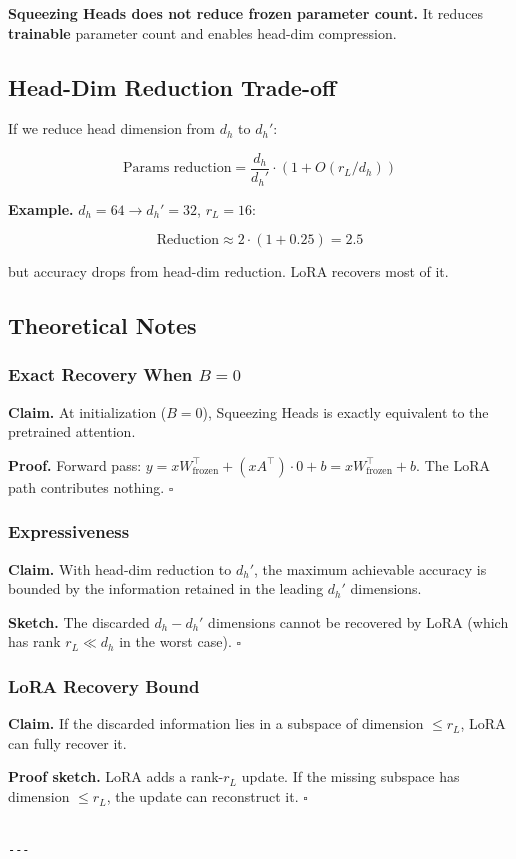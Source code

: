 \textbf{Squeezing Heads does not reduce frozen parameter count.} It reduces 
\textbf{trainable} parameter count and enables head-dim compression.

\subsection{Head-Dim Reduction Trade-off}

If we reduce head dimension from $d_h$ to $d_h'$:

\[
\text{Params reduction} = \frac{d_h}{d_h'} \cdot \left(1 + O(r_L / d_h)\right)
\]

\textbf{Example.} $d_h = 64 \to d_h' = 32$, $r_L = 16$:

\[
\text{Reduction} \approx 2 \cdot (1 + 0.25) = 2.5
\]

but accuracy drops from head-dim reduction. LoRA recovers most of it.

\subsection{Theoretical Notes}

\subsubsection{Exact Recovery When $B = 0$}

\textbf{Claim.} At initialization ($B = 0$), Squeezing Heads is exactly 
equivalent to the pretrained attention.

\textbf{Proof.} Forward pass: $y = x W_\text{frozen}^\top + (x A^\top) \cdot 0 + b = x W_\text{frozen}^\top + b$. The LoRA path contributes nothing. $\square$

\subsubsection{Expressiveness}

\textbf{Claim.} With head-dim reduction to $d_h'$, the maximum achievable 
accuracy is bounded by the information retained in the leading $d_h'$ 
dimensions.

\textbf{Sketch.} The discarded $d_h - d_h'$ dimensions cannot be recovered by 
LoRA (which has rank $r_L \ll d_h$ in the worst case). $\square$

\subsubsection{LoRA Recovery Bound}

\textbf{Claim.} If the discarded information lies in a subspace of dimension 
$\leq r_L$, LoRA can fully recover it.

\textbf{Proof sketch.} LoRA adds a rank-$r_L$ update. If the missing subspace 
has dimension $\leq r_L$, the update can reconstruct it. $\square$
\begin{lstlisting}

---
\end{lstlisting}